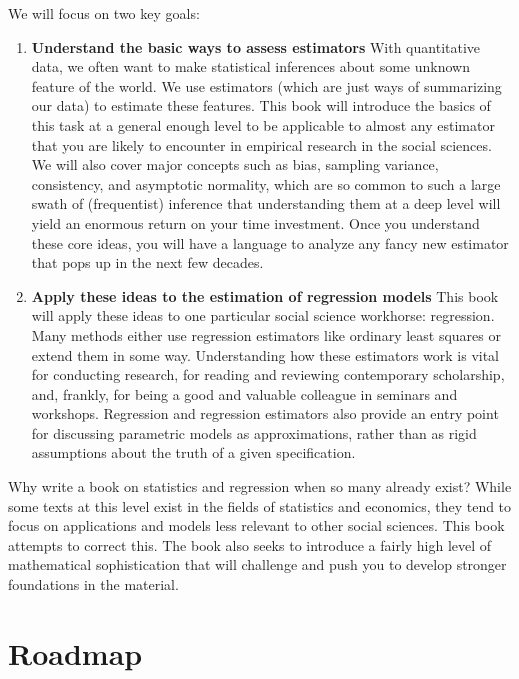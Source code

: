 \documentclass[
  13pt,
  letterpaper,
  DIV=11,
  numbers=noendperiod]{scrreprt}
\theoremstyle{definition}
\theoremstyle{definition}
\theoremstyle{plain}
\theoremstyle{remark}
\begin{document}
We will focus on two key goals:

\begin{enumerate}
\def\labelenumi{\arabic{enumi}.}
\item
  \textbf{Understand the basic ways to assess estimators} With
  quantitative data, we often want to make statistical inferences about
  some unknown feature of the world. We use estimators (which are just
  ways of summarizing our data) to estimate these features. This book
  will introduce the basics of this task at a general enough level to be
  applicable to almost any estimator that you are likely to encounter in
  empirical research in the social sciences. We will also cover major
  concepts such as bias, sampling variance, consistency, and asymptotic
  normality, which are so common to such a large swath of (frequentist)
  inference that understanding them at a deep level will yield an
  enormous return on your time investment. Once you understand these
  core ideas, you will have a language to analyze any fancy new
  estimator that pops up in the next few decades.
\item
  \textbf{Apply these ideas to the estimation of regression models} This
  book will apply these ideas to one particular social science
  workhorse: regression. Many methods either use regression estimators
  like ordinary least squares or extend them in some way. Understanding
  how these estimators work is vital for conducting research, for
  reading and reviewing contemporary scholarship, and, frankly, for
  being a good and valuable colleague in seminars and workshops.
  Regression and regression estimators also provide an entry point for
  discussing parametric models as approximations, rather than as rigid
  assumptions about the truth of a given specification.
\end{enumerate}

Why write a book on statistics and regression when so many already
exist? While some texts at this level exist in the fields of statistics
and economics, they tend to focus on applications and models less
relevant to other social sciences. This book attempts to correct this.
The book also seeks to introduce a fairly high level of mathematical
sophistication that will challenge and push you to develop stronger
foundations in the material.

\section*{Roadmap}\label{roadmap}
\end{document}
